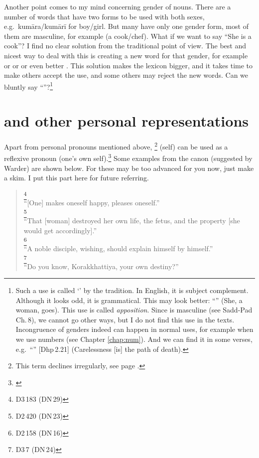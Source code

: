 Another point comes to my mind concerning gender of nouns. There are a number of words that have two forms to be used with both sexes, e.g.\ kum\=ara/kum\=ar\=i for boy/girl. But many have only one gender form, most of them are masculine, for example  (a cook/chef). What if we want to say ``She is a cook''? I find no clear solution from the traditional point of view. The best and nicest way to deal with this is creating a new word for that gender, for example  or  or  or even better . This solution makes the lexicon bigger, and it takes time to make others accept the use, and some others may reject the new words. Can we bluntly say ``''?\footnote{Such a use is called `' by the tradition. In English, it is subject complement. Although it looks odd, it is grammatical. This may look better: ``'' (She, a woman, goes). This use is called \emph{apposition}. Since  is masculine (see Sadd-Pad Ch.\,8), we cannot go other ways, but I do not find this use in the texts. Incongruence of genders indeed can happen in normal uses, for example when we use numbers (see Chapter \ref{chap:num}). And we can find it in some verses, e.g.\ ``'' [Dhp\,2.21] (Carelessness [is] the path of death).}

{}
\section*{ and other personal representations}

Apart from personal pronouns mentioned above, \footnote{This term declines irregularly, see page \pageref{decl:atta}.} (self) can be used as a reflexive pronoun (one's own self).\footnote{\citealp[pp.~185--6]{warder:intro}} Some examples from the canon (suggested by Warder) are shown below. For these may be too advanced for you now, just make a skim. I put this part here for future referring.

\begin{quote}
\footnote{D3\,183 (DN\,29)}\\
``[One] makes oneself happy, pleases oneself.''\\[1.5mm]
\footnote{D2\,420 (DN\,23)}\\
``That [woman] destroyed her own life, the fetus, and the property [she would get accordingly].''\\[1.5mm]
\footnote{D2\,158 (DN\,16)}\\
``A noble disciple, wishing, should explain himself by himself.''\\[1.5mm]
\footnote{D3\,7 (DN\,24)}\\
``Do you know, Korakkhattiya, your own destiny?''\\[1.5mm]
\end{quote}

